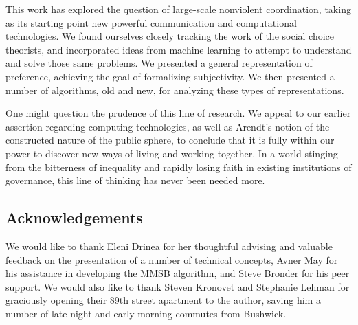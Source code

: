 \bigskip

This work has explored the question of large-scale nonviolent coordination, taking as its starting point new powerful communication and computational technologies.
We found ourselves closely tracking the work of the social choice theorists, and incorporated ideas from machine learning to attempt to understand and solve those same problems.
We presented a general representation of preference, achieving the goal of formalizing subjectivity.
We then presented a number of algorithms, old and new, for analyzing these types of representations.

\bigskip

One might question the prudence of this line of research.
We appeal to our earlier assertion regarding computing technologies, as well as Arendt's notion of the constructed nature of the public sphere, to conclude that it is fully within our power to discover new ways of living and working together.
In a world stinging from the bitterness of inequality and rapidly losing faith in existing institutions of governance, this line of thinking has never been needed more.

\subsection{Acknowledgements}

We would like to thank Eleni Drinea for her thoughtful advising and valuable feedback on the presentation of a number of technical concepts, Avner May for his assistance in developing the MMSB algorithm, and Steve Bronder for his peer support.
We would also like to thank Steven Kronovet and Stephanie Lehman for graciously opening their 89th street apartment to the author, saving him a number of late-night and early-morning commutes from Bushwick. 